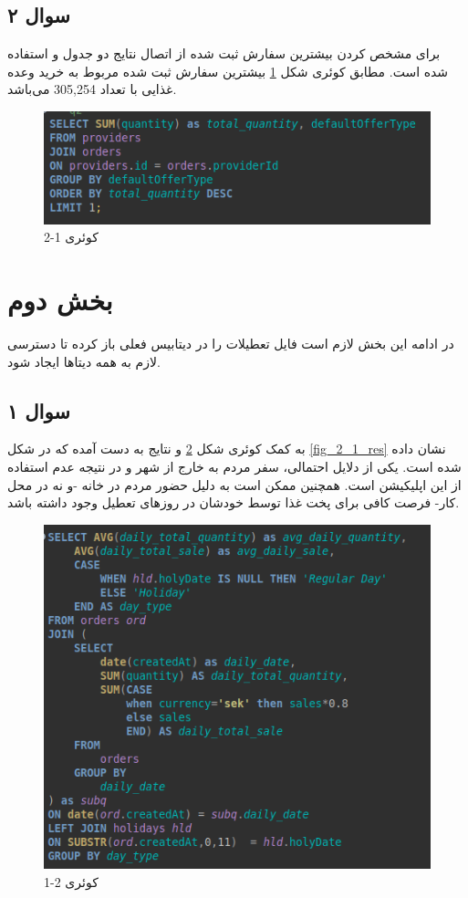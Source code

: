 \documentclass[a4paper,12pt,fullpage]{article}
\begin{document}
\subsection{سوال ۲}
برای مشخص کردن بیشترین سفارش ثبت شده از اتصال نتایج دو جدول  و   استفاده شده است. مطابق کوئری شکل \ref{fig1_2} بیشترین سفارش ثبت شده مربوط به خرید وعده غذایی با تعداد 305,254 می‌باشد.


\begin{figure}[hbt!]
	\includegraphics[width=\linewidth]{"./images/q1.2.png"}
	\caption{کوئری 1-2}
		\label{fig1_2}
\end{figure}

\section{بخش دوم}
در ادامه این بخش لازم است فایل  تعطیلات را در دیتابیس فعلی باز کرده تا دسترسی لازم به همه دیتاها ایجاد شود.

\subsection{سوال ۱}
به کمک کوئری شکل \ref{fig2_1} و نتایج به دست آمده که در شکل \ref{fig_2_1_res} نشان داده شده است. یکی از دلایل احتمالی، سفر مردم به خارج از شهر و در نتیجه عدم استفاده از این اپلیکیشن است. همچنین ممکن است به دلیل حضور مردم در خانه -و نه در محل کار- فرصت کافی برای پخت غذا توسط خودشان در روزهای تعطیل وجود داشته باشد.
\begin{figure}[hbt!]
	\includegraphics[width=\linewidth]{"./images/q2.1.png"}
	\caption{کوئری 2-1}
	\label{fig2_1}
\end{figure}
\end{document}
